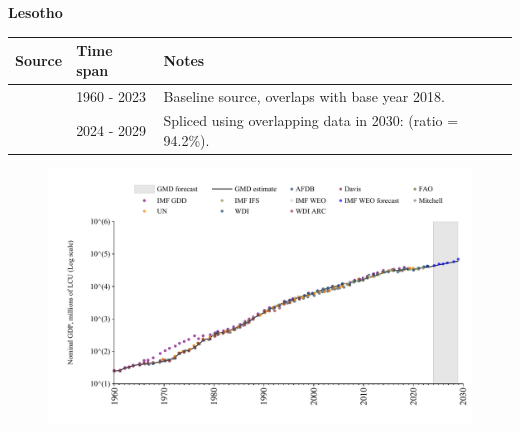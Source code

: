 \documentclass[12pt,a4paper,landscape]{article}
\begin{document}
\begin{adjustbox}{max totalsize={\paperwidth}{\paperheight},center}
\begin{minipage}[t][\textheight][t]{\textwidth}
\vspace*{0.5cm}
{}
\begin{center}
{\Large\bfseries Lesotho}
\end{center}
\vspace{0.5cm}
\begin{table}[H]
\centering
\small
\begin{tabular}{|l|l|l|}
\hline
\textbf{Source} & \textbf{Time span} & \textbf{Notes} \\
\hline
\rowcolor{white}\cite{WDI}& 1960 - 2023 &Baseline source, overlaps with base year 2018.\\
\rowcolor{lightgray}\cite{IMF_WEO_forecast}& 2024 - 2029 &Spliced using overlapping data in 2030: (ratio = 94.2\%).\\
\hline
\end{tabular}
\end{table}
\begin{figure}[H]
\centering
\includegraphics[width=\textwidth,height=0.6\textheight,keepaspectratio]{graphs/LSO_nGDP.pdf}
\end{figure}
\end{minipage}
\end{adjustbox}
\end{document}
